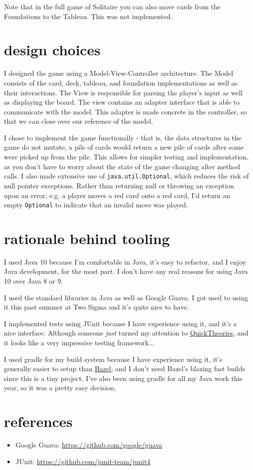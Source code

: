 \documentclass[paper=letter, fontsize=12pt]{article}
\numberwithin{equation}{section} %
\numberwithin{figure}{section} %
\numberwithin{table}{section} %
\begin{document}
Note that in the full game of Solitaire you can also move cards from the
Foundations to the Tableau.  This was not implemented.

\section{design choices}

I designed the game using a Model-View-Controller architecture.  The Model
consists of the card, deck, tableau, and foundation implementations as well as
their interactions.  The View is responsible for parsing the player's input as
well as displaying the board.  The view contains an adapter interface that is
able to communicate with the model.  This adapter is made concrete in the
controller, so that we can close over our reference of the model.

I chose to implement the game functionally - that is, the data structures in
the game do not mutate; a pile of cards would return a new pile of cards after
some were picked up from the pile.  This allows for simpler testing and
implementation, as you don't have to worry about the state of the game changing
after method calls.  I also made extensive use of \texttt{java.util.Optional},
which reduces the risk of null pointer exceptions.  Rather than returning null
or throwing an exception upon an error, e.g. a player moves a red card onto a
red card, I'd return an empty \texttt{Optional} to indicate that an invalid
move was played.

\section{rationale behind tooling}

I used Java 10 because I'm comfortable in Java, it's easy to refactor, and I
enjoy Java development, for the most part.  I don't have any real reasons for
using Java 10 over Java 8 or 9.  

I used the standard libraries in Java as well as Google Guava.  I got used to
using it this past summer at Two Sigma and it's quite nice to have.  

I implemented tests using JUnit because I have experience using it, and it's a
nice interface.  Although someone \textit{just} turned my attention to
\href{https://github.com/ncredinburgh/QuickTheories}{QuickTheories}, and it
looks like a very impressive testing framework...

I used gradle for my build system because I have experience using it, it's
generally easier to setup than \href{https://bazel.build/}{Bazel}, and I don't
need Bazel's blazing fast builds since this is a tiny project.  I've also been
using gradle for all my Java work this year, so it was a pretty easy decision.

\section{references}

\begin{itemize}
  \item Google Guava: \href{https://github.com/google/guava}{https://github.com/google/guava}
  \item JUnit: \href{https://github.com/junit-team/junit4}{https://github.com/junit-team/junit4}
\end{itemize}
\end{document}
